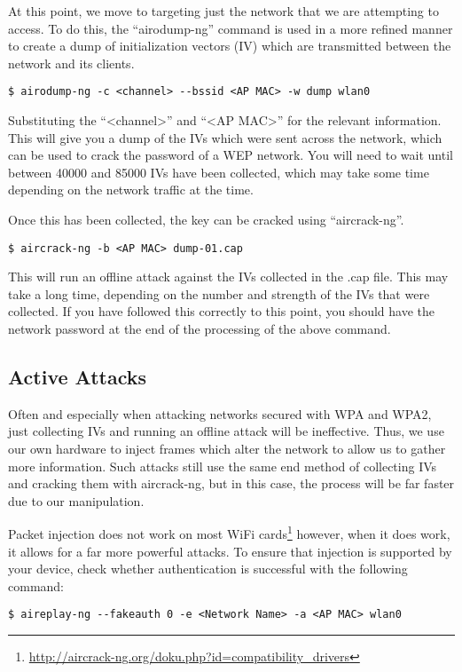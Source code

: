 			At this point, we move to targeting just the network that we are attempting to access. 
			To do this, the ``airodump-ng'' command is used in a more refined manner to create a dump of initialization vectors (IV) which are transmitted between the network and its clients. 
			\begin{lstlisting}[style=CLI]
				$ airodump-ng -c <channel> --bssid <AP MAC> -w dump wlan0
			\end{lstlisting}
			Substituting the ``<channel>'' and ``<AP MAC>'' for the relevant information. 
			This will give you a dump of the IVs which were sent across the network, which can be used to crack the password of a WEP network. 
			You will need to wait until between 40000 and 85000 IVs have been collected, which may take some time depending on the network traffic at the time. 
			
			Once this has been collected, the key can be cracked using ``aircrack-ng''.
			\begin{lstlisting}[style=CLI]
				$ aircrack-ng -b <AP MAC> dump-01.cap
			\end{lstlisting}
			This will run an offline attack against the IVs collected in the .cap file.
			This may take a long time, depending on the number and strength of the IVs that were collected.
			If you have followed this correctly to this point, you should have the network password at the end of the processing of the above command. 
		\subsection{Active Attacks}
			Often and especially when attacking networks secured with WPA and WPA2, just collecting IVs and running an offline attack will be ineffective. 
			Thus, we use our own hardware to inject frames which alter the network to allow us to gather more information. 
			Such attacks still use the same end method of collecting IVs and cracking them with aircrack-ng, but in this case, the process will be far faster due to our manipulation. 

			Packet injection does not work on most WiFi cards\footnote{\url{http://aircrack-ng.org/doku.php?id=compatibility\_drivers}}
			however, when it does work, it allows for a far more powerful attacks. 
			To ensure that injection is supported by your device, check whether authentication is successful with the following command:
			\begin{lstlisting}[style=CLI]
				$ aireplay-ng --fakeauth 0 -e <Network Name> -a <AP MAC> wlan0
			\end{lstlisting}

